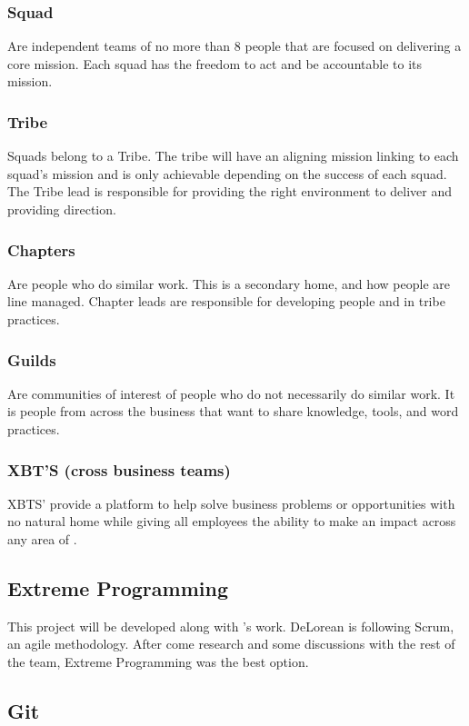 \subsubsection*{Squad}

Are independent teams of no more than 8 people that are focused on delivering a core mission. Each squad has the freedom to act and be accountable to its mission.

\subsubsection*{Tribe}

Squads belong to a Tribe. The tribe will have an aligning mission linking to each squad's mission and is only achievable depending on the success of each squad. The Tribe lead is responsible for providing the right environment to deliver and providing direction. 

\subsubsection*{Chapters}

Are people who do similar work. This is a secondary home, and how people are line managed. Chapter leads are responsible for developing people and in tribe practices.

\subsubsection*{Guilds}

Are communities of interest of people who do not necessarily do similar work. It is people from across the business that want to share knowledge, tools, and word practices. 

\subsubsection*{XBT'S (cross business teams)}

XBTS' provide a platform to help solve business problems or opportunities with no natural home while giving all employees the ability to make an impact across any area of \company.

\subsection{Extreme Programming}

This project will be developed along with \squad's work. DeLorean is following Scrum, an agile methodology. After come research and some discussions with the rest of the team, Extreme Programming was the best option.

\subsection{Git}
